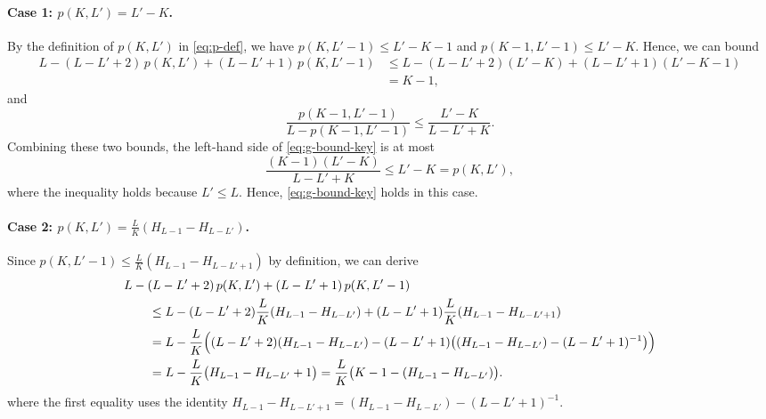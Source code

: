 \documentclass[english]{article}
\begin{document}
\paragraph{Case 1: $p(K, L') = L'-K$.}
By the definition of $p(K, L')$ in \eqref{eq:p-def}, we have $p(K, L'-1) \leq L'-K-1$ and $p(K-1, L'-1) \leq L'-K$. Hence, we can bound
\begin{align*}
    L - (L-L'+2)\,p(K,L') + (L-L'+1)\,p(K, L'-1) &\leq L - (L-L'+2)(L'-K) + (L-L'+1)(L'-K-1) \\
    & = K - 1,
\end{align*}
and $$\frac{p(K-1, L'-1)}{L-p(K-1, L'-1)} \leq \frac{L'-K}{L-L'+K}.$$
Combining these two bounds, the left-hand side of \eqref{eq:g-bound-key} is at most
\[
    \frac{(K-1)(L'-K)}{L-L'+K} \leq L'-K = p(K, L'),
\]
where the inequality holds because $L' \leq L$. Hence, \eqref{eq:g-bound-key} holds in this case.

\paragraph{Case 2: $p(K, L') = \frac{L}{K}(H_{L-1} - H_{L-L'})$.}
Since $p(K, L'-1) \leq \frac{L}{K}(H_{L-1} - H_{L-L'+1})$ by definition, we can derive
\begin{align}
    &L - (L-L'+2)\,p(K, L') + (L-L'+1)\,p(K, L'-1) \notag \\
    &\qquad \leq L - (L-L'+2)\frac{L}{K}(H_{L-1} - H_{L-L'}) + (L-L'+1)\frac{L}{K}(H_{L-1} - H_{L-L'+1}) \notag \\
    &\qquad = L - \frac{L}{K}\Big((L-L'+2)(H_{L-1} - H_{L-L'}) - (L-L'+1)\big((H_{L-1} - H_{L-L'}) - (L-L'+1)^{-1}\big)\Big) \notag \\
    &\qquad = L - \frac{L}{K}\big(H_{L-1} - H_{L-L'} + 1\big) = \frac{L}{K}\big(K - 1 - (H_{L-1} - H_{L-L'})\big). \label{eq:g-bound-key-lhs}
\end{align}
where the first equality uses the identity $H_{L-1} - H_{L-L'+1} = (H_{L-1} - H_{L-L'}) - (L-L'+1)^{-1}$.
\end{document}
